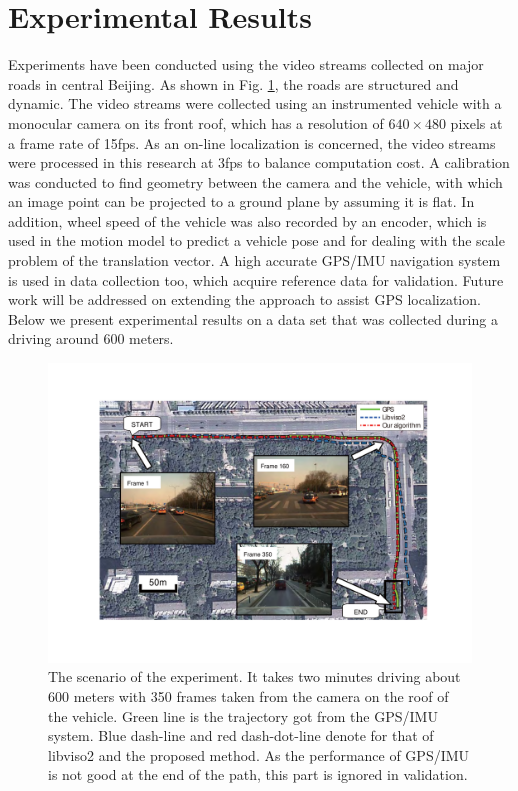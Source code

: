 \documentclass[letterpaper, 10 pt, conference]{ieeeconf}  %
\begin{document}
\section{Experimental Results}
\label{sec_experiments}
Experiments have been conducted using the video streams collected on major roads in central Beijing. As shown in Fig. \ref{fig:scenario}, the roads are structured and dynamic. The video streams were collected using an instrumented vehicle with a monocular camera on its front roof, which has a resolution of $640\times480$ pixels at a frame rate of 15fps. As an on-line localization is concerned, the video streams were processed in this research at 3fps to balance computation cost. A calibration was conducted to find geometry between the camera and the vehicle, with which an image point can be projected to a ground plane by assuming it is flat. In addition, wheel speed of the vehicle was also recorded by an encoder, which is used in the motion model to predict a vehicle pose and for dealing with the scale problem of the translation vector. A high accurate GPS/IMU navigation system is used in data collection too, which acquire reference data for validation. Future work will be addressed on extending the approach to assist GPS localization. Below we present experimental results on a data set that was collected during a driving around 600 meters.

\begin{figure}[t]
\centering
\includegraphics[width=0.9\linewidth]{source//Final//senario.pdf}
\caption{The scenario of the experiment. It takes two minutes driving about 600 meters with 350 frames taken from the camera on the roof of the vehicle. Green line is the trajectory got from the GPS/IMU system. Blue dash-line and red dash-dot-line denote for that of libviso2 and the proposed method. As the performance of GPS/IMU is not good at the end of the path, this part is ignored in validation.}
\label{fig:scenario}
\end{figure}
\end{document}
